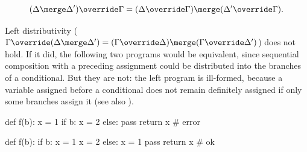 \begin{lemma}
\label{lem:right-distributivity}
\[
(\Delta \merge \Delta') \override \Gamma = (\Delta \override \Gamma) \merge (\Delta' \override \Gamma).
\]
\end{lemma}

\noindent Left distributivity ($\Gamma \override (\Delta \merge \Delta') = (\Gamma \override \Delta) \merge
(\Gamma \override \Delta')$) does not hold. If it did, the following two programs would be equivalent, since
sequential composition with a preceding assignment could be distributed into the branches of a conditional.
But they are not: the left program is ill-formed, because a variable assigned before a conditional does not
remain definitely assigned if only some branches assign it (see also ).
\vspace{-\medskipamount}

\begin{minipage}[t]{0.48\textwidth}
\begin{python}
def f(b):
    x = 1
    if b:
        x = 2
    else:
        pass
    return x  # error
\end{python}
\end{minipage}
\hfill
\begin{minipage}[t]{0.48\textwidth}
\begin{python}
def f(b):
    if b:
        x = 1
        x = 2
    else:
        x = 1
        pass
    return x  # ok
\end{python}
\end{minipage}
